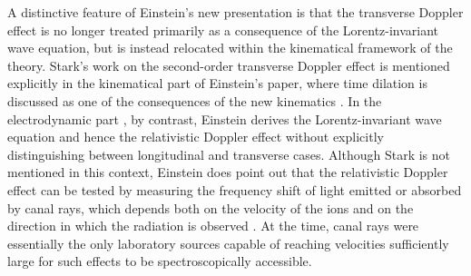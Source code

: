\documentclass[pdflatex]{sn-jnl} %
\begin{document}
A distinctive feature of Einstein’s new presentation is that the transverse Doppler effect is no longer treated primarily as a consequence of the Lorentz-invariant wave equation, but is instead relocated within the kinematical framework of the theory. Stark’s work on the second-order transverse Doppler effect is mentioned explicitly in the kinematical part  of Einstein’s paper, where time dilation is discussed as one of the consequences of the new kinematics \citep[422]{Einstein1908}. In the electrodynamic part , by contrast, Einstein derives the Lorentz-invariant wave equation and hence the relativistic Doppler effect without explicitly distinguishing between longitudinal and transverse cases. Although Stark is not mentioned in this context, Einstein does point out that the relativistic Doppler effect can be tested by measuring the frequency shift of light emitted or absorbed by canal rays, which depends both on the velocity of the ions and on the direction in which the radiation is observed \citep[425]{Einstein1907a}. At the time, canal rays were essentially the only laboratory sources capable of reaching velocities sufficiently large for such effects to be spectroscopically accessible.



\end{document}
